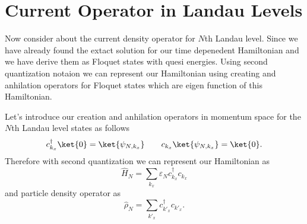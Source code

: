 \section{Current Operator in Landau Levels}

Now consider about the current density operator for $N$th Landau level. Since we have already found the extact solution for our time depenedent Hamiltonian and we have derive them as Floquet states with quesi energies. Using second quantization notaion we can represent our Hamiltonian using creating and anhilation operators for Floquet states which are eigen function of this Hamiltonian.

\vspace{5mm}
\noindent
Let's introduce our creation and anhilation operators in momentum space for the $N$th Landau level states as follows
\begin{equation} \label{7.1}
  c_{k_x}^{\dagger} \ket{0} = \ket{\psi_{N,k_x}} \quad \text \quad
  c_{k_x} \ket{\psi_{N,k_x}}  = \ket{0}.
\end{equation}
Therefore with second quantization we can represent our Hamiltonian as
\begin{equation} \label{7.2}
  \hat{H}_N = \sum_{k_x} \varepsilon_N c_{k_x}^{\dagger}c_{k_x}
\end{equation}
and particle density operator as
\begin{equation} \label{7.3}
  \hat{\rho}_N = \sum_{{k'}_x} c_{{k'}_x}^{\dagger}c_{{k'}_x}.
\end{equation}

